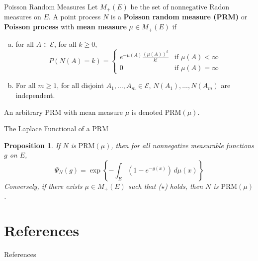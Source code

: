 \documentclass{beamer}
\newtheorem{proposition}{Proposition}
\begin{document}
\begin{frame}{Poisson Random Measures}
    Let $M_+(E)$ be the set of nonnegative Radon measures on $E$. A point process $N$ is a \textbf{Poisson random measure (PRM)} or \textbf{Poisson process} with \textbf{mean measure} $\mu \in M_+(E)$ if
    \begin{enumerate}[(a)]
    \item for all $A \in \mathcal{E}$, for all $k \ge 0$,
    \[
    P(N(A) = k) =
        \begin{cases}
            e^{-\mu(A)}\frac{(\mu(A))^k}{k!} & \text{if $\mu(A) < \infty$} \\
            0 & \text{if $\mu(A) = \infty$}
        \end{cases}
    \]
    \item For all $m \ge 1$, for all disjoint $A_1, \ldots, A_m \in \mathcal{E}$, $N(A_1), \ldots, N(A_m)$ are independent.
    \end{enumerate}
    An arbitrary PRM with mean measure $\mu$ is denoted $\text{PRM}(\mu)$.
\end{frame}

\begin{frame}{The Laplace Functional of a PRM}
    \begin{proposition}
        If $N$ is $\text{PRM}(\mu)$, then for all nonnegative measurable functions $g$ on $E$,
        \[
        \Psi_N(g) = \exp\left\{-\int_E \left(1 - e^{-g(x)}\right)\,d\mu(x)\right\} \tag{$\star$}
        \]
        Conversely, if there exists $\mu \in M_+(E)$ such that ($\star$) holds, then $N$ is $\text{PRM}(\mu)$.
    \end{proposition}
\end{frame}

\section{References}

\begin{frame}[allowframebreaks]{References}
    \nocite{*}
    \printbibliography
\end{frame}
\end{document}

